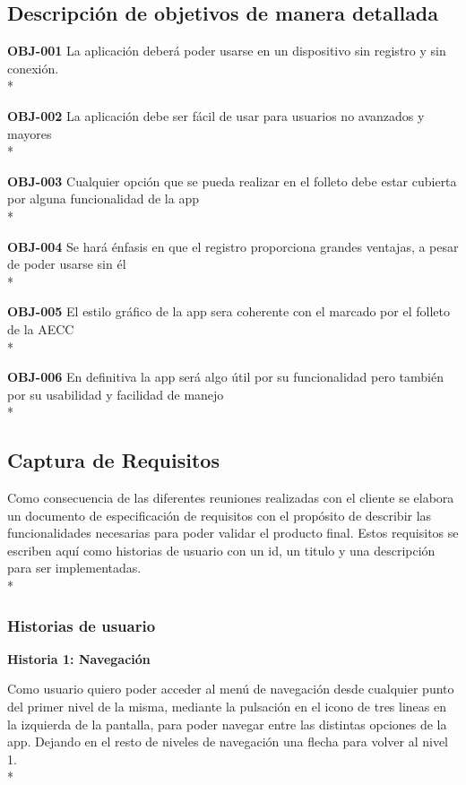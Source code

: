 \documentclass[../pfc.tex]{subfiles}
\begin{document}
		
	\subsection{Descripción de objetivos de manera detallada}
	
	
	\textbf{OBJ-001}	La aplicación deberá poder usarse en un dispositivo sin registro y sin conexión.\\*
	
	\textbf{OBJ-002}	La aplicación debe ser fácil de usar para usuarios no avanzados y mayores\\*
	
	\textbf{OBJ-003}	Cualquier opción que se pueda realizar en el folleto debe estar cubierta por alguna funcionalidad de la app\\*
	
	\textbf{OBJ-004}	Se hará énfasis en que el registro proporciona grandes ventajas, a pesar de poder usarse sin él\\*

	\textbf{OBJ-005}	El estilo gráfico de la app sera coherente con el marcado por el folleto de la AECC\\*
	
	\textbf{OBJ-006}	En definitiva la app será algo útil por su funcionalidad pero también por su usabilidad y facilidad de manejo\\*
	
	
	\subsection{Captura de Requisitos}
	
	Como consecuencia de las diferentes reuniones realizadas con el cliente se elabora un
	documento de especificación de requisitos con el propósito de describir las funcionalidades
	necesarias para poder validar el producto final. Estos requisitos se escriben aquí como historias de usuario con un id, un titulo y una descripción para ser implementadas. \\*
	
	\subsubsection{Historias de usuario}
			
	\textbf{Historia 1: Navegación}

		Como usuario quiero poder acceder al menú de navegación desde cualquier punto del primer nivel de la misma, mediante la pulsación en el icono de tres lineas en la izquierda de la pantalla, para poder navegar entre las distintas opciones de la app. Dejando en el resto de niveles de navegación una flecha para volver al nivel 1.\\*
		
\end{document}
